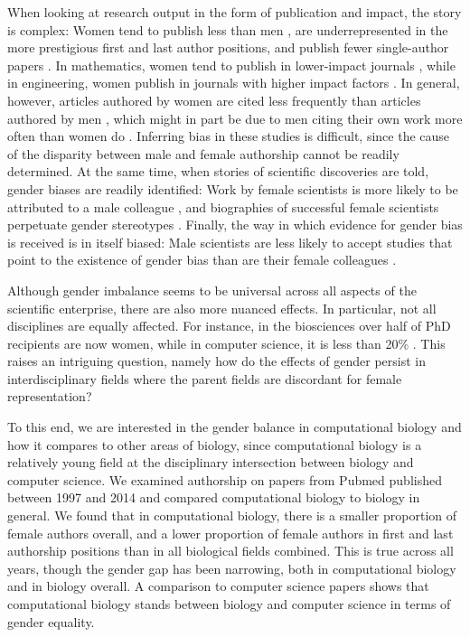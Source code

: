 \documentclass[10pt,letterpaper]{article}
\begin{document}
\begin{flushleft}
When looking at research output in the form of publication and impact, the story is complex: Women tend to publish less than men \cite{Lariviere2013}, are underrepresented in the more prestigious first and last author positions, and publish fewer single-author papers \cite{West2013}. In mathematics, women tend to publish in lower-impact journals \cite{Mihaljevic-Brandt2016}, while in engineering, women publish in journals with higher impact factors \cite{Ghiasi2015}. In general, however, articles authored by women are cited less frequently than articles authored by men \cite{Lariviere2013,Ghiasi2015}, which might in part be due to men citing their own work more often than women do \cite{King2016}. Inferring bias in these studies is difficult, since the cause of the disparity between male and female authorship cannot be readily determined. At the same time, when stories of scientific discoveries are told, gender biases are readily identified: Work by female scientists is more likely to be attributed to a male colleague \cite{Rossiter1993}, and biographies of successful female scientists perpetuate gender stereotypes \cite{Fara2013}. Finally, the way in which evidence for gender bias is received is in itself biased:  Male scientists are less likely to accept studies that point to the existence of gender bias than are their female colleagues \cite{Handley2015}.

Although gender imbalance seems to be universal across all aspects of the scientific enterprise, there are also more nuanced effects. In particular, not all disciplines are equally affected. For instance, in the biosciences over half of PhD recipients are now women, while in computer science, it is less than 20\% \cite{NSF2015}. This raises an intriguing question, namely how do the effects of gender persist in interdisciplinary fields where the parent fields are discordant for female representation?

To this end, we are interested in the gender balance in computational biology and how it compares to other areas of biology, since computational biology is a relatively young field at the disciplinary intersection between biology and computer science. We examined authorship on papers from Pubmed published between 1997 and 2014 and compared computational biology to biology in general. We found that in computational biology, there is a smaller proportion of female authors overall, and a lower proportion of female authors in first and last authorship positions than in all biological fields combined. This is true across all years, though the gender gap has been narrowing, both in computational biology and in biology overall. A comparison to computer science papers shows that computational biology stands between biology and computer science in terms of gender equality.


\end{flushleft}
\end{document}
